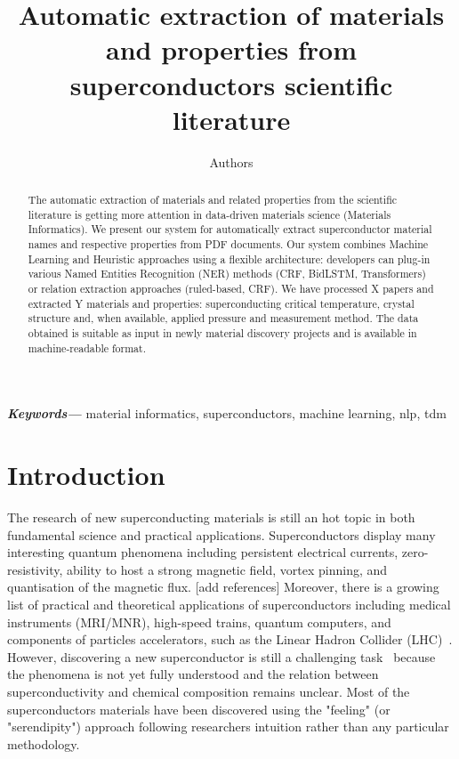 \documentclass{article}
\title{Automatic extraction of materials and properties from superconductors scientific literature}
\author{Authors}
\providecommand{\keywords}[1]
{
  \small	
  \textbf{\textit{Keywords---}} #1
}
\begin{document}
\maketitle

\begin{abstract}
The automatic extraction of materials and related properties from the scientific literature is getting more attention in data-driven materials science (Materials Informatics). 
We present our system for automatically extract superconductor material names and respective properties from PDF documents.
Our system combines Machine Learning and Heuristic approaches using a flexible architecture: developers can plug-in various Named Entities Recognition (NER) methods (CRF, BidLSTM, Transformers) or relation extraction approaches (ruled-based, CRF).
We have processed X papers and extracted Y materials and properties: superconducting critical temperature, crystal structure and, when available, applied pressure and measurement method.
The data obtained is suitable as input in newly material discovery projects and is available in machine-readable format.
\end{abstract}

\keywords{material informatics, superconductors, machine learning, nlp, tdm}

\section{Introduction}
The research of new superconducting materials is still an hot topic in both fundamental science and practical applications.
Superconductors display many interesting quantum phenomena including persistent electrical currents, zero-resistivity, ability to host a strong magnetic field, vortex pinning, and quantisation of the magnetic flux. [add references]
Moreover, there is a growing list of practical and theoretical applications of superconductors including medical instruments (MRI/MNR), high-speed trains, quantum computers, and components of particles accelerators, such as the Linear Hadron Collider (LHC)~\cite{PhilippeBook, Kizu2010ConstructionOT, Cardani2017NewAO}.
However, discovering a new superconductor is still a challenging task~\cite{PhysRevB.103.014509, doi:10.1088/1468-6996/16/3/033503} because the phenomena is not yet fully understood and the relation between superconductivity and chemical composition remains unclear. 
Most of the superconductors materials have been discovered using the "feeling" (or "serendipity") approach following researchers intuition rather than any particular methodology.~\cite{doi:10.1080/08957959.2019.1695253}
\end{document}
